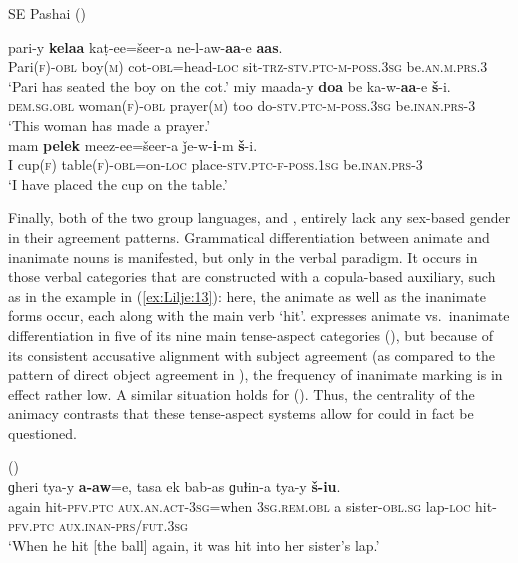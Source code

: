 \documentclass[output=collectionpaper]{langsci/langscibook}
\begin{document}
\ea
\label{ex:Lilje:12}
SE Pashai (\citealt[290, 297]{Lehr2014})\\
\begin{xlist}
\ex
\gll pari-y \textbf{kelaa} kaṭ-ee=šeer-a ne-l-aw-\textbf{aa}-e \textbf{aas}.\\
Pari(\textsc{f})-\textsc{obl} boy(\textsc{m}) cot-\textsc{obl}=head-\textsc{loc} sit-\textsc{trz-stv.ptc-m-poss.3sg} be.\textsc{an.m.prs.3}\\
\glt `Pari has seated the boy on the cot.'
\ex
\gll miy maada-y \textbf{doa} be ka-w-\textbf{aa}-e \textbf{š}-i.  \\
\textsc{dem.sg.obl} woman(\textsc{f})-\textsc{obl} prayer(\textsc{m}) too do-\textsc{stv.ptc-m-poss.3sg} be.\textsc{inan.prs-3}  \\
\glt `This woman has made a prayer.' \\
\ex
\gll mam \textbf{pelek} meez-ee=šeer-a ǰe-w-\textbf{i}-m \textbf{š}-i.   \\
I cup(\textsc{f}) table(\textsc{f})-\textsc{obl}=on-\textsc{loc} place-\textsc{stv.ptc-f-poss.1sg} be.\textsc{inan.prs-3}   \\
\glt `I have placed the cup on the table.'
\end{xlist}
\z

Finally, both of the two  group languages,  and , entirely lack any sex-based gender in their agreement patterns. Grammatical differentiation between animate and inanimate nouns is manifested, but only in the verbal paradigm. It occurs in those verbal categories that are constructed with a copula-based auxiliary, such as in the  example in (\ref{ex:Lilje:13}): here, the animate as well as the inanimate forms occur, each along with the main verb `hit'.  expresses animate vs.\ inanimate differentiation in five of its nine main tense-aspect categories (\citealt[60--72]{Bashir1988}), but because of its consistent accusative alignment with subject agreement (as compared to the pattern of direct object agreement in ), the frequency of inanimate marking is in effect rather low. A similar situation holds for  (\citealt[123--133]{Bashir1988}). Thus, the centrality of the animacy contrasts that these tense-aspect systems allow for could in fact be questioned.

\ea
\label{ex:Lilje:13}
 (\citealt[250]{HeegardPetersen2015})\\
\gll ɡheri tya{}-y \textbf{a{}-}\textbf{aw}=e, tasa ek bab{}-as ɡuɫin{}-a tya{}-y \textbf{š{}-}\textbf{iu}.    \\
again hit-\textsc{pfv.ptc} \textsc{aux.an.act-3sg}=when \textsc{3sg.rem.obl} a sister-\textsc{obl.sg} lap-\textsc{loc} hit-\textsc{pfv.ptc} \textsc{aux.inan-prs/fut.3sg}\\
\glt `When he hit [the ball] again, it was hit into her sister's lap.'
\z
\end{document}
